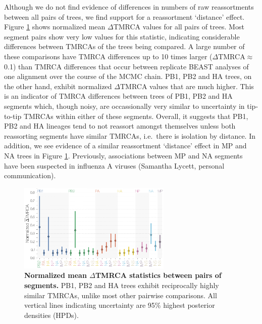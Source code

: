 \documentclass[11pt,oneside,letterpaper]{article}
\begin{document}
Although we do not find evidence of differences in numbers of raw reassortments between all pairs of trees, we find support for a reassortment `distance' effect.
Figure \ref{deltaTMRCA} shows normalized mean $\Delta$TMRCA values for all pairs of trees.
Most segment pairs show very low values for this statistic, indicating considerable differences between TMRCAs of the trees being compared.
A large number of these comparisons have TMRCA differences up to 10 times larger ($\Delta$TMRCA$\approx$0.1) than TMRCA differences that occur between replicate BEAST analyses of one alignment over the course of the MCMC chain.
PB1, PB2 and HA trees, on the other hand, exhibit normalized $\Delta$TMRCA values that are much higher.
This is an indicator of TMRCA differences between trees of PB1, PB2 and HA segments which, though noisy, are occassionally very similar to uncertainty in tip-to-tip TMRCAs within either of these segments.
Overall, it suggests that PB1, PB2 and HA lineages tend to not reassort amongst themselves unless both reassorting segments have similar TMRCAs, i.e.\ there is isolation by distance.
In addition, we see evidence of a similar reassortment `distance' effect in MP and NA trees in Figure \ref{deltaTMRCA}.
Previously, associations between MP and NA segments have been suspected in influenza A viruses (Samantha Lycett, personal communication).

\begin{figure}[h]
	\centering		
	\includegraphics[width=0.65\textwidth]{figures/InfB_normalizedMuDeltaTMRCA.png}
	\caption{\textbf{Normalized mean $\Delta$TMRCA statistics between pairs of segments.}
PB1, PB2 and HA trees exhibit reciprocally highly similar TMRCAs, unlike most other pairwise comparisons.
All vertical lines indicating uncertainty are 95\% highest posterior densities (HPDs).}
	\label{deltaTMRCA}
\end{figure}
\end{document}
